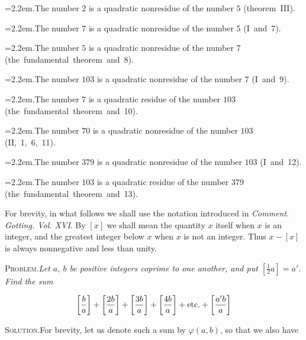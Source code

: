 {\raggedright\hangindent=2.2em.\quad The number $2$ is a quadratic nonresidue of the number $5$ \mbox{(theorem III)}.\par}

{\raggedright\hangindent=2.2em.\quad The number $7$ is a quadratic nonresidue of the number $5$ \mbox{(I and 7)}.\par}

{\raggedright\hangindent=2.2em.\quad The number $5$ is a quadratic nonresidue of the number $7$ \mbox{(the fundamental theorem and 8)}.\par}

{\raggedright\hangindent=2.2em.\quad The number $103$ is a quadratic nonresidue of the number $7$ \mbox{(I and 9)}.\par}

{\raggedright\hangindent=2.2em.\quad The number $7$ is a quadratic residue of the number $103$ \mbox{(the fundamental theorem and 10)}.\par}

{\raggedright\hangindent=2.2em.\quad The number $70$ is a quadratic nonresidue of the number $103$ \mbox{(II, 1, 6, 11)}.\par}

{\raggedright\hangindent=2.2em.\quad The number $379$ is a quadratic nonresidue of the number $103$ \mbox{(I and 12)}.\par}

{\raggedright\hangindent=2.2em.\quad The number $103$ is a quadratic residue of the number $379$ \mbox{(the fundamental theorem and 13)}.\par}

For brevity, in what follows we shall use the notation introduced in \textit{Comment. Gotting. Vol. XVI}. By $[x]$ we shall mean the quantity $x$ itself when $x$ is an integer, and the greatest integer below $x$ when $x$ is not an integer. Thus $x-[x]$ is always nonnegative and less than unity.


\textsc{Problem.}\quad \textit{Let $a,\ b$ be positive integers coprime to one another, and put $[\frac12a]=a'$. Find the sum}

\[
\left[\frac ba\right]+\left[\frac{2b}a\right]+\left[\frac{3b}a\right]+\left[\frac{4b}a\right]+\text{etc.}+\left[\frac{a'b}a\right]
\]

\textsc{Solution.}\quad For brevity, let us denote such a sum by $\varphi(a,b)$, so that we also have

